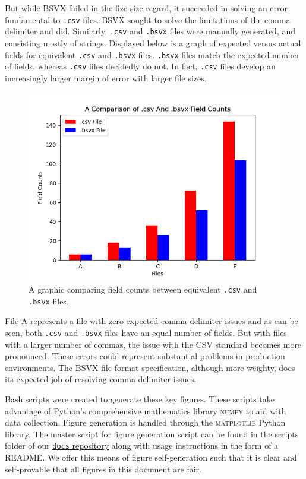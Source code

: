 \documentclass[10pt]{article}
\begin{document}
\indent{}
But while BSVX failed in the fize size regard, it succeeded in solving an error fundamental to \texttt{.csv} files.
BSVX sought to solve the limitations of the comma delimiter and did.
Similarly, \texttt{.csv} and \texttt{.bsvx} files were manually generated, and consisting mostly of strings.
Displayed below is a graph of expected versus actual fields for equivalent \texttt{.csv} and \texttt{.bsvx} files.
\texttt{.bsvx} files match the expected number of fields, whereas \texttt{.csv} files decidedly do not.
In fact, \texttt{.csv} files develop an increasingly larger margin of error with larger file sizes.

\begin{figure}[H]
\centering
\includegraphics[width=5in]{figures/2.png}
\caption{A graphic comparing field counts between equivalent \texttt{.csv} and \texttt{.bsvx} files.}
\label{fig:results_2}
\end{figure}

\indent{}
File A represents a file with zero expected comma delimiter issues and as can be seen, both \texttt{.csv} and \texttt{.bsvx} files have an equal number of fields.
But with files with a larger number of commas, the issue with the CSV standard becomes more pronounced.
These errors could represent substantial problems in production environments.
The BSVX file format specification, although more weighty, does its expected job of resolving comma delimiter issues.

\indent{}
Bash scripts were created to generate these key figures.
These scripts take advantage of Python's comprehensive mathematics library \textsc{numpy} to aid with data collection.
Figure generation is handled through the \textsc{matplotlib} Python library.
The master script for figure generation script can be found in the scripts folder of our \href{https://github.com/bsvx/docs}{\texttt{docs} repository} along with usage instructions in the form of a README.
We offer this means of figure self-generation such that it is clear and self-provable that all figures in this document are fair.
\end{document}
